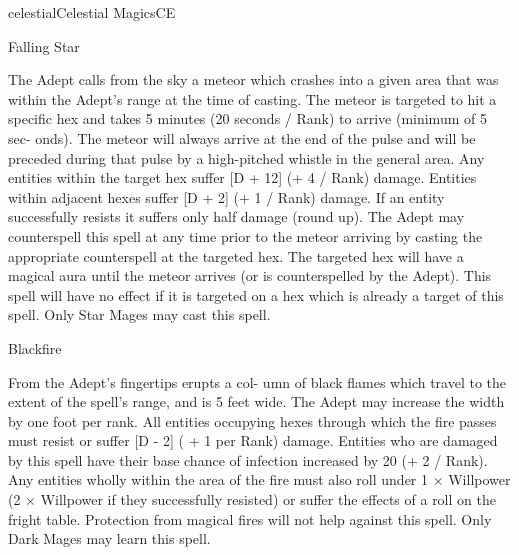 \begin{College}[1.3]{celestial}{Celestial Magics}{CE}
\begin{spell}[S-10 Star]{Falling Star}
\begin{effects}
 The  Adept  calls  from  the  sky  a  meteor 
which crashes into a given area that was within the 
Adept’s range at the time of casting. The meteor is 
targeted  to  hit  a  specific  hex  and  takes  5  minutes 
(20  seconds  /  Rank)  to  arrive  (minimum  of  5  sec-
onds). The meteor  will always arrive at the end of 
the pulse and will be preceded during that pulse by 
a  high-pitched  whistle  in  the  general  area.  Any 
entities within the target hex suffer [D + 12] (+ 4 / 
Rank)  damage.  Entities  within  adjacent  hexes 
suffer  [D  +  2]  (+  1  /  Rank)  damage.  If  an  entity 
successfully  resists  it  suffers  only  half  damage 
(round  up).  The  Adept  may  counterspell  this  spell 
at any time prior to the meteor arriving by casting 
the  appropriate  counterspell  at  the  targeted  hex. 
The targeted hex will have a magical aura until the 
meteor arrives (or is counterspelled by the Adept). 
This  spell  will  have  no  effect  if  it is targeted  on  a 
hex  which  is  already  a  target  of  this  spell.  Only 
Star Mages may cast this spell. 
\end{effects}
\end{spell}

\begin{spell}[S-10 Dark]{Blackfire}

\begin{effects}
 From  the  Adept’s  fingertips  erupts  a  col-
umn  of  black  flames  which  travel  to  the  extent  of 
the  spell’s  range,  and  is  5  feet  wide.  The  Adept 
may  increase  the  width  by  one  foot  per  rank.  All 
entities  occupying  hexes  through  which  the  fire 
passes must resist or suffer [D - 2] ( + 1 per Rank) 
damage.  Entities  who  are  damaged  by  this  spell 
have their base chance of infection increased by 20 
(+ 2 / Rank). Any entities wholly within the area of 
the  fire  must  also  roll  under  1  ×  Willpower  (2  × 
Willpower  if  they  successfully  resisted)  or  suffer 
the  effects  of  a  roll  on  the  fright  table.  Protection 
from magical  fires  will  not  help  against  this  spell. 
Only Dark Mages may learn this spell. 
\end{effects}
\end{spell}


\end{College}
